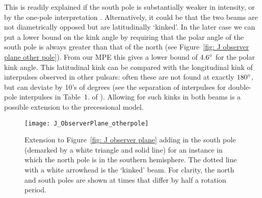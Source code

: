 \documentclass[../full_thesis/full_thesis.tex]{subfiles}
\begin{document}
\begin{subappendices}
This is readily explained if the south pole is substantially weaker in
intensity, or by the one-pole interpretation \citet{Manchester1977}.
Alternatively, it could be that  the two beams are not diametrically opposed
but are latitudinally `kinked'. In the later case we can put a lower bound on
the kink angle by requiring that the polar angle of the south pole is always
greater than that of the north (see Figure~\ref{fig: J observer  plane other
pole}). From our MPE this gives a lower bound of $4.6^{\circ}$ for the polar kink
angle. This latitudinal kink can be compared with the longitudinal kink of
interpulses observed in other pulsars: often these are not found at exactly
$180^{\circ}$, but can deviate by 10's of degrees (see the separation of
interpulses for double-pole interpulses in Table~1. of \cite{Maciesiak2011}).
Allowing for such kinks in both beams is a possible extension to the
precessional model.

\begin{figure}
\centering
\texttt{[image: J\_ObserverPlane\_otherpole]}
\caption{Extension to Figure~\ref{fig: J observer plane} adding in the south pole
(demarked by a white triangle and solid line) for an instance in which the
north pole is in the southern hemisphere. The dotted line with a white
arrowhead is the `kinked' beam.  For clarity, the north and south poles are
shown at times that differ by half a rotation period.}
\label{fig: J observer plane other pole}
\end{figure}


\end{subappendices}
\end{document}
